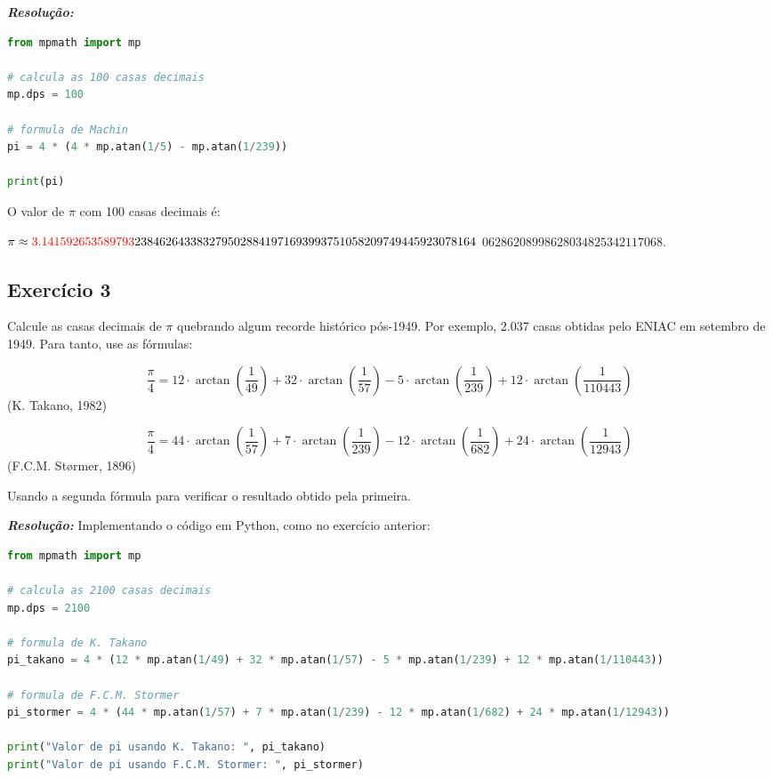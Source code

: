 \documentclass[12pt]{article}
\begin{document}
\textit{\textbf{Resolução:}}

\begin{lstlisting}[language=Python, caption=Implementação do cálculo em Python]
from mpmath import mp

# calcula as 100 casas decimais
mp.dps = 100

# formula de Machin
pi = 4 * (4 * mp.atan(1/5) - mp.atan(1/239))

print(pi)
\end{lstlisting}
O valor de \(\pi\) com 100 casas decimais é:

\(
\pi \approx \textcolor{red}{3.141592653589793}2384626433832795028841971693993751058209749445923078164
\)
\(06286208998628034825342117068.\)

\newpage
\subsection{Exercício 3}
Calcule as casas decimais de \(\pi\) quebrando algum recorde histórico pós-1949. Por exemplo, 2.037 casas obtidas pelo ENIAC em setembro de 1949. Para tanto, use as fórmulas:

\[
\frac{\pi}{4} = 12 \cdot \arctan\left(\frac{1}{49}\right) + 32 \cdot \arctan\left(\frac{1}{57}\right) - 5 \cdot \arctan\left(\frac{1}{239}\right) + 12 \cdot \arctan\left(\frac{1}{110443}\right)
\]
(K. Takano, 1982)

\[
\frac{\pi}{4} = 44 \cdot \arctan\left(\frac{1}{57}\right) + 7 \cdot \arctan\left(\frac{1}{239}\right) - 12 \cdot \arctan\left(\frac{1}{682}\right) + 24 \cdot \arctan\left(\frac{1}{12943}\right)
\]
(F.C.M. Størmer, 1896)

\vspace{0.2cm}
Usando a segunda fórmula para verificar o resultado obtido pela primeira.

\textit{\textbf{Resolução:}}
Implementando o código em Python, como no exercício anterior:

\begin{lstlisting}[language=Python, caption=Calculando 2100 casas decimais de PI]
from mpmath import mp

# calcula as 2100 casas decimais
mp.dps = 2100

# formula de K. Takano 
pi_takano = 4 * (12 * mp.atan(1/49) + 32 * mp.atan(1/57) - 5 * mp.atan(1/239) + 12 * mp.atan(1/110443))

# formula de F.C.M. Stormer
pi_stormer = 4 * (44 * mp.atan(1/57) + 7 * mp.atan(1/239) - 12 * mp.atan(1/682) + 24 * mp.atan(1/12943))

print("Valor de pi usando K. Takano: ", pi_takano)
print("Valor de pi usando F.C.M. Stormer: ", pi_stormer)
\end{lstlisting}
\end{document}
